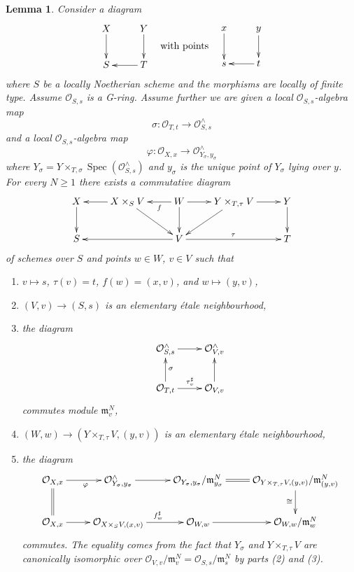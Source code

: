 \documentclass{amsart}
\theoremstyle{plain}
\newtheorem{lemma}[subsection]{Lemma}
\theoremstyle{definition}
\theoremstyle{remark}
\numberwithin{equation}{subsection}
\def\Spec{\mathop{\mathrm{Spec}}}
\begin{document}
\begin{lemma}
\label{lemma-relative-map-approximation}
Consider a diagram
$$
\vcenter{
\xymatrix{
X \ar[d] & Y \ar[d] \\
S & T \ar[l]
}
}
\quad\text{with points}\quad
\vcenter{
\xymatrix{
x \ar[d] & y \ar[d] \\
s & t \ar[l]
}
}
$$
where $S$ be a locally Noetherian scheme and the morphisms are
locally of finite type. Assume $\mathcal{O}_{S, s}$ is a G-ring.
Assume further we are given a local $\mathcal{O}_{S, s}$-algebra map
$$
\sigma : \mathcal{O}_{T, t} \longrightarrow \mathcal{O}_{S, s}^\wedge
$$
and a local $\mathcal{O}_{S, s}$-algebra map
$$
\varphi :
\mathcal{O}_{X, x}
\longrightarrow
\mathcal{O}_{Y_\sigma, y_\sigma}^\wedge
$$
where $Y_\sigma = Y \times_{T, \sigma} \Spec(\mathcal{O}_{S, s}^\wedge)$
and $y_\sigma$ is the unique point of $Y_\sigma$ lying over $y$.
For every $N \geq 1$ there exists a commutative diagram
$$
\xymatrix{
X \ar[d] & X \times_S V \ar[l] \ar[rd] &
W \ar[l]^-f \ar[r] \ar[d] &
Y \times_{T, \tau} V \ar[r] \ar[ld] & Y \ar[d] \\
S & & V \ar[ll] \ar[rr]^\tau & & T
}
$$
of schemes over $S$ and points $w \in W$, $v \in V$ such that
\begin{enumerate}
\item $v \mapsto s$, $\tau(v) = t$, $f(w) = (x, v)$, and $w \mapsto (y, v)$,
\item $(V, v) \to (S, s)$ is an elementary \'etale neighbourhood,
\item the diagram
$$
\xymatrix{
\mathcal{O}_{S, s}^\wedge \ar[r] & \mathcal{O}_{V, v}^\wedge \\
\mathcal{O}_{T, t} \ar[r]^{\tau^\sharp_v} \ar[u]_\sigma &
\mathcal{O}_{V, v} \ar[u]
}
$$
commutes module $\mathfrak m_v^N$,
\item $(W, w) \to (Y \times_{T, \tau} V, (y, v))$ is an
elementary \'etale neighbourhood,
\item the diagram
$$
\xymatrix{
\mathcal{O}_{X, x} \ar[r]_\varphi &
\mathcal{O}_{Y_\sigma, y_\sigma}^\wedge \ar[r] &
\mathcal{O}_{Y_\sigma, y_\sigma}/\mathfrak m_{y_\sigma}^N \ar@{=}[r] &
\mathcal{O}_{Y \times_{T, \tau} V, (y, v)}/\mathfrak m_{(y, v)}^N
\ar[d]_{\cong} \\
\mathcal{O}_{X, x} \ar[r] \ar@{=}[u] &
\mathcal{O}_{X \times_S V, (x, v)} \ar[r]^{f^\sharp_w} &
\mathcal{O}_{W, w} \ar[r] &
\mathcal{O}_{W, w}/\mathfrak m_w^N
}
$$
commutes. The equality comes from the fact that
$Y_\sigma$ and $Y \times_{T, \tau} V$ are canonically isomorphic over
$\mathcal{O}_{V, v}/\mathfrak m_v^N = \mathcal{O}_{S, s}/\mathfrak m_s^N$
by parts (2) and (3).
\end{enumerate}
\end{lemma}
\end{document}
